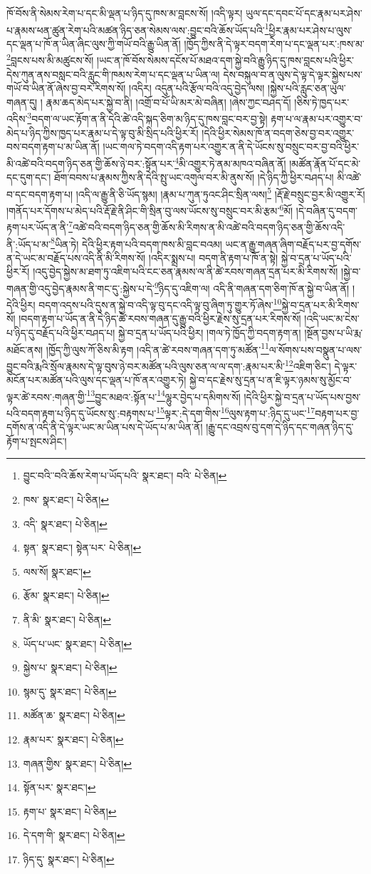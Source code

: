 ཁོ་བོས་ནི་སེམས་རེག་པ་དང་མི་ལྡན་པ་ཉིད་དུ་ཁས་མ་བླངས་སོ། །འདི་ལྟར། ཡུལ་དང་དབང་པོ་དང་རྣམ་པར་ཤེས་པ་རྣམས་ཕན་ཚུན་རེག་པའི་མཚན་ཉིད་ཅན་སེམས་ལས་:བྱུང་བའི་ཆོས་ཡོད་པའི་\footnote{བྱུང་བའི་་བའི་ཆོས་རེག་པ་ཡོད་པའི་  སྣར་ཐང་། བའི་  པེ་ཅིན། }ཕྱིར་རྣམ་པར་ཤེས་པ་ལུས་དང་ལྡན་པ་ཁོ་ན་ཡིན་ཞིང་ལུས་ཀྱི་གཡོ་བའི་རྒྱུ་ཡིན་ནོ། །ཁྱོད་ཀྱིས་ནི་དེ་ལྟར་བདག་རེག་པ་དང་ལྡན་པར་:ཁས་མ་\footnote{ཁས་  སྣར་ཐང་།  པེ་ཅིན། }བླངས་པས་མི་མཚུངས་སོ། །ཡང་ན་ཁོ་བོས་སེམས་དངོས་པོ་མཐའ་དག་སྐྱེ་བའི་རྒྱུ་ཉིད་དུ་ཁས་བླངས་པའི་ཕྱིར་དེས་ཀུན་ནས་བསླང་བའི་རླུང་གི་ཁམས་རེག་པ་དང་ལྡན་པ་ཡིན་ལ། དེས་བསྐུལ་བ་ན་ལུས་དེ་ལྟ་དེ་ལྟར་སྐྱེས་པས་གཡོ་བ་ཡིན་ནོ་ཞེས་བྱ་བར་རིགས་སོ། །འདིར། འདུན་པའི་རྩོལ་བའི་འདུ་བྱེད་ལས། །སྐྱེས་པའི་རླུང་ཅན་ཡུལ་གཞན་དུ། །
རྣམ་ཆད་མེད་པར་སྐྱེ་བ་ནི། །འགྲོ་བ་པོ་ཡི་མར་མེ་བཞིན། །ཞེས་ཀྱང་བཤད་དོ། །ཅིས་ཏེ་ཁྱད་པར་འདིས་\footnote{འདི་  སྣར་ཐང་།  པེ་ཅིན། }བདག་ལ་ཡང་རྟོག་ན་ནི་དེའི་ཚེ་འདི་སྐད་ཅིག་མ་ཉིད་དུ་ཁས་བླང་བར་བྱ་སྟེ། རྟག་པ་ལ་རྣམ་པར་འགྱུར་བ་མེད་པ་ཉིད་ཀྱིས་ཁྱད་པར་རྣམ་པ་དེ་ལྟ་བུ་མི་སྲིད་པའི་ཕྱིར་རོ། །དེའི་ཕྱིར་སེམས་ཁོ་ན་བདག་ཅེས་བྱ་བར་འགྱུར་བས་བདག་རྟག་པ་མ་ཡིན་ནོ། །ཡང་གལ་ཏེ་བདག་འདི་རྟག་པར་འགྱུར་ན་ནི་དེ་ཡོངས་སུ་བསྲུང་བར་བྱ་བའི་ཕྱིར་མི་འཚེ་བའི་བདག་ཉིད་ཅན་གྱི་ཆོས་ཉེ་བར་:སྟོན་པར་\footnote{སྟན་  སྣར་ཐང་། སྟེན་པར་  པེ་ཅིན། }མི་འགྱུར་ཏེ་ནམ་མཁའ་བཞིན་ནོ། །མཚོན་རྣོན་པོ་དང་མེ་དང་དུག་དང་། ཐོག་བབས་པ་རྣམས་ཀྱིས་ནི་དེའི་སྤུ་ཡང་འགུལ་བར་མི་ནུས་སོ། །དེ་ཉིད་ཀྱི་ཕྱིར་བཤད་པ། མི་འཚེ་བ་དང་བདག་རྟག་པ། །འདི་ལ་རྒྱུ་ནི་ཅི་ཡོད་སྙམ། །རྣམ་པ་ཀུན་ཏུའང་ཤིང་སྲིན་ལས།\footnote{ལས་སོ།  སྣར་ཐང་། } །རྡོ་རྗེ་བསྲུང་བྱར་མི་འགྱུར་རོ། །གནོད་པར་དོགས་པ་མེད་པའི་རྡོ་རྗེ་ནི་ཤིང་གི་སྲིན་བུ་ལས་ཡོངས་སུ་བསྲུང་བར་མི་རྩམ་\footnote{རྩོམ་  སྣར་ཐང་།  པེ་ཅིན། }མོ། །དེ་བཞིན་དུ་བདག་རྟག་པར་ཡོད་ན་ནི་\footnote{ནི་མི་  སྣར་ཐང་།  པེ་ཅིན། }འཚེ་བའི་བདག་ཉིད་ཅན་གྱི་ཆོས་མི་རིགས་ན་མི་འཚེ་བའི་བདག་ཉིད་ཅན་གྱི་ཆོས་འདི་ནི་:ཡོད་པ་མ་\footnote{ཡོད་པ་ཡང་  སྣར་ཐང་།  པེ་ཅིན། }ཡིན་ཏེ། དེའི་ཕྱིར་རྟག་པའི་བདག་ཁས་མི་བླང་བའམ། ཡང་ན་རྒྱུ་གཞན་ཞིག་བརྗོད་པར་བྱ་དགོས་ན་དེ་ཡང་མ་བརྗོད་པས་འདི་ནི་མི་རིགས་སོ། །འདིར་སྨྲས་པ། བདག་ནི་རྟག་པ་ཁོ་ན་སྟེ། སྐྱེ་བ་དྲན་པ་ཡོད་པའི་ཕྱིར་རོ། །འདུ་བྱེད་སྐྱེས་མ་ཐག་ཏུ་འཇིག་པའི་ངང་ཅན་རྣམས་ལ་ནི་ཚེ་རབས་གཞན་དྲན་པར་མི་རིགས་སོ། །སྐྱེ་བ་གཞན་གྱི་འདུ་བྱེད་རྣམས་ནི་གང་དུ་:སྐྱེས་པ་དེ་\footnote{སྐྱེས་པ་  སྣར་ཐང་།  པེ་ཅིན། }ཉིད་དུ་འཇིག་ལ། འདི་ནི་གཞན་དག་ཅིག་ཁོ་ན་སྐྱེ་བ་ཡིན་ནོ། །དེའི་ཕྱིར། བདག་འདས་པའི་དུས་ན་སྐྱེ་བ་འདི་ལྟ་བུ་དང་འདི་ལྟ་བུ་ཞིག་ཏུ་གྱུར་ཏོ་ཞེས་\footnote{སྙམ་དུ་  སྣར་ཐང་།  པེ་ཅིན། }སྐྱེ་བ་དྲན་པར་མི་རིགས་སོ། །བདག་རྟག་པ་ཡོད་ན་ནི་དེ་ཉིད་ཚེ་རབས་གཞན་དུ་རྒྱུ་བའི་ཕྱིར་རྗེས་སུ་དྲན་པར་རིགས་སོ། །འདི་ཡང་མ་ངེས་པ་ཉིད་དུ་བརྗོད་པའི་ཕྱིར་བཤད་པ། སྐྱེ་བ་དྲན་པ་ཡོད་པའི་ཕྱིར། །གལ་ཏེ་ཁྱོད་ཀྱི་བདག་རྟག་ན། །སྔོན་བྱས་པ་ཡི་རྨ་མཐོང་ནས། །ཁྱོད་ཀྱི་ལུས་ཀོ་ཅིས་མི་རྟག །འདི་ན་ཚེ་རབས་གཞན་དག་ཏུ་མཚོན་\footnote{མཚོན་ཆ་  སྣར་ཐང་།  པེ་ཅིན། }ལ་སོགས་པས་བསྣུན་པ་ལས་བྱུང་བའི་རྨའི་སྲོལ་རྣམས་དེ་ལྟ་བུས་ཉེ་བར་མཚོན་པའི་ལུས་ཅན་ལ་ལ་དག་:རྣམ་པར་མི་\footnote{རྣམ་པར་  སྣར་ཐང་།  པེ་ཅིན། }འཇིག་ཅིང་། དེ་ལྟར་མངོན་པར་མཚོན་པའི་ལུས་དང་ལྡན་པ་ཁོ་ནར་འགྱུར་ཏེ། སྐྱེ་བ་དང་རྗེས་སུ་དྲན་པ་ན་ཇི་ལྟར་ཉམས་སུ་མྱོང་བ་ལྟར་ཚེ་རབས་:གཞན་གྱི་\footnote{གཞན་གྱིས་  སྣར་ཐང་།  པེ་ཅིན། }བྱུང་མཐའ་:སྟོན་པ་\footnote{སྟོན་པར་  སྣར་ཐང་། }ལྷུར་བྱེད་པ་དམིགས་སོ། །དེའི་ཕྱིར་སྐྱེ་བ་དྲན་པ་ཡོད་པས་བྱས་པའི་བདག་རྟག་པ་ཉིད་དུ་ཡོངས་སུ་:བརྟགས་པ་\footnote{རྟག་པ་  སྣར་ཐང་།  པེ་ཅིན། }ལྟར་:དེ་དག་གིས་\footnote{དེ་དག་གི་  སྣར་ཐང་།  པེ་ཅིན། }ལུས་རྟག་པ་:ཉིད་དུ་ཡང་\footnote{ཉིད་དུ་  སྣར་ཐང་།  པེ་ཅིན། }བརྟག་པར་བྱ་དགོས་ན་འདི་ནི་དེ་ལྟར་ཡང་མ་ཡིན་པས་དེ་ཡོད་པ་མ་ཡིན་ནོ། །རྒྱུ་དང་འབྲས་བུ་དག་དེ་ཉིད་དང་གཞན་ཉིད་དུ་རྟོག་པ་སྤངས་ཤིང་། 